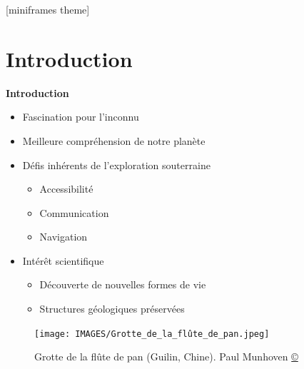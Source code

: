 \documentclass[aspectratio=169,10pt]{beamer}
\title[Titre court]{\titre}
\subtitle{\soustitre}
\author{\auteur}
\institute{\institut \newline \titrefooter}
\date{\presentationdate}
\begin{document}


\begin{frame}
    \titlepage
\end{frame}

[miniframes theme]
\customfootline

\section{Introduction}

\begin{frame}{\textbf{Introduction}}
	\begin{minipage}{0.6\linewidth}
		\begin{itemize}
			\item Fascination pour l'inconnu
			\vspace{0.2cm}
			\item Meilleure compréhension de notre planète
			\vspace{0.2cm}
			\item Défis inhérents de l'exploration souterraine
			\begin{itemize}
				\item Accessibilité
				\vspace{0.2cm}
				\item Communication
				\vspace{0.2cm}
				\item Navigation
			\end{itemize}
			\vspace{0.2cm}
			\item Intérêt scientifique
			\begin{itemize}
				\item Découverte de nouvelles formes de vie
				\vspace{0.2cm}
				\item Structures géologiques préservées
			\end{itemize}
		\end{itemize}
	\end{minipage}
	\hfill
	\begin{minipage}{0.35\linewidth}
		\begin{figure}
			\centering
			\texttt{[image: IMAGES/Grotte\_de\_la\_flûte\_de\_pan.jpeg]}
			\caption{Grotte de la flûte de pan (Guilin, Chine). Paul Munhoven \href{https://commons.wikimedia.org/w/index.php?curid=27712205}{\copyright}}
			\label{fig:china_cave}
		\end{figure}
	\end{minipage}

\end{frame}
\end{document}
